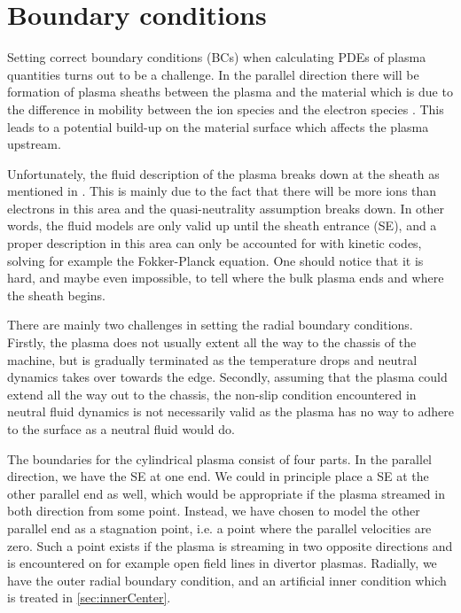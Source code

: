 \section{Boundary conditions}
\label{sec:BCs}
%
Setting correct boundary conditions (BCs) when calculating PDEs of plasma quantities turns out to be a challenge.
In the parallel direction there will be formation of plasma sheaths between the plasma and the material which is due to the difference in mobility between the ion species and the electron species \cite{Stangeby2000book}.
This leads to a potential build-up on the material surface which affects the plasma upstream.

Unfortunately, the fluid description of the plasma breaks down at the sheath as mentioned in \cite{Loizu2012a}.
This is mainly due to the fact that there will be more ions than electrons in this area and the quasi-neutrality assumption breaks down.
In other words, the fluid models are only valid up until the sheath entrance (SE), and a proper description in this area can only be accounted for with kinetic codes, solving for example the Fokker-Planck equation.
One should notice that it is hard, and maybe even impossible, to tell where the bulk plasma ends and where the sheath begins.

There are mainly two challenges in setting the radial boundary conditions.
Firstly, the plasma does not usually extent all the way to the chassis of the machine, but is gradually terminated as the temperature drops and neutral dynamics takes over towards the edge.
Secondly, assuming that the plasma could extend all the way out to the chassis, the non-slip condition encountered in neutral fluid dynamics \cite{Kundu2010book} is not necessarily valid as the plasma has no way to adhere to the surface as a neutral fluid would do.

The boundaries for the cylindrical plasma consist of four parts.
In the parallel direction, we have the SE at one end.
We could in principle place a SE at the other parallel end as well, which would be appropriate if the plasma streamed in both direction from some point.
Instead, we have chosen to model the other parallel end as a stagnation point, i.e. a point where the parallel velocities are zero.
Such a point exists if the plasma is streaming in two opposite directions and is encountered on for example open field lines in divertor plasmas.
Radially, we have the outer radial boundary condition, and an artificial inner condition which is treated in \cref{sec:innerCenter}.


